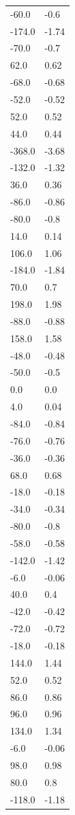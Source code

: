 \begin{longtable}{ll}
-60.0 & -0.6 \\
-174.0 & -1.74 \\
-70.0 & -0.7 \\
62.0 & 0.62 \\
-68.0 & -0.68 \\
-52.0 & -0.52 \\
52.0 & 0.52 \\
44.0 & 0.44 \\
-368.0 & -3.68 \\
-132.0 & -1.32 \\
36.0 & 0.36 \\
-86.0 & -0.86 \\
-80.0 & -0.8 \\
14.0 & 0.14 \\
106.0 & 1.06 \\
-184.0 & -1.84 \\
70.0 & 0.7 \\
198.0 & 1.98 \\
-88.0 & -0.88 \\
158.0 & 1.58 \\
-48.0 & -0.48 \\
-50.0 & -0.5 \\
0.0 & 0.0 \\
4.0 & 0.04 \\
-84.0 & -0.84 \\
-76.0 & -0.76 \\
-36.0 & -0.36 \\
68.0 & 0.68 \\
-18.0 & -0.18 \\
-34.0 & -0.34 \\
-80.0 & -0.8 \\
-58.0 & -0.58 \\
-142.0 & -1.42 \\
-6.0 & -0.06 \\
40.0 & 0.4 \\
-42.0 & -0.42 \\
-72.0 & -0.72 \\
-18.0 & -0.18 \\
144.0 & 1.44 \\
52.0 & 0.52 \\
86.0 & 0.86 \\
96.0 & 0.96 \\
134.0 & 1.34 \\
-6.0 & -0.06 \\
98.0 & 0.98 \\
80.0 & 0.8 \\
-118.0 & -1.18 \\

\end{longtable}
